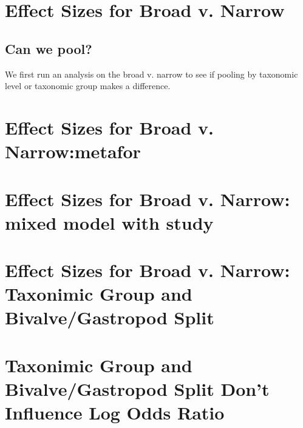 \documentclass{article}\usepackage{graphicx, color}
\begin{document}

\section{Effect Sizes for Broad v. Narrow}
\subsection{Can we pool?}
We first run an analysis on the broad v. narrow to see if pooling by taxonomic level or taxonomic group makes a difference.






\section{Effect Sizes for Broad v. Narrow:metafor}






\section{Effect Sizes for Broad v. Narrow: mixed model with study}





\section{Effect Sizes for Broad v. Narrow: Taxonimic Group and Bivalve/Gastropod Split}





\section{Taxonimic Group and Bivalve/Gastropod Split Don't Influence Log Odds Ratio}




\end{document}
